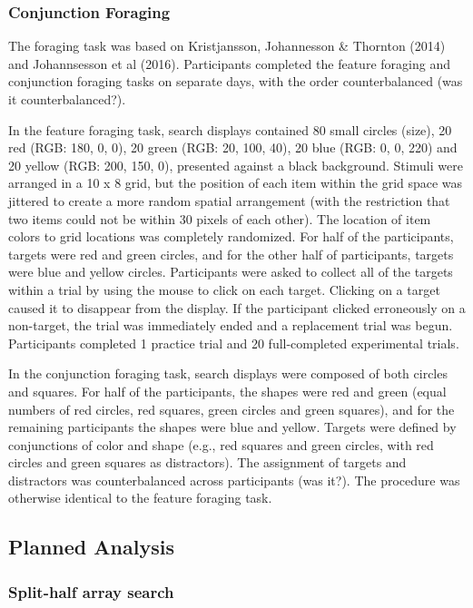 \documentclass[]{rsos}%
\begin{document}
\subsubsection{Conjunction Foraging}

The foraging task was based on Kristjansson, Johannesson & Thornton (2014) and Johannsesson et al (2016). Participants completed the feature foraging and conjunction foraging tasks on separate days, with the order counterbalanced (was it counterbalanced?).

In the feature foraging task, search displays contained 80 small circles (size), 20 red (RGB: 180, 0, 0), 20 green (RGB: 20, 100, 40), 20 blue (RGB: 0, 0, 220) and 20 yellow (RGB: 200, 150, 0), presented against a black background. Stimuli were arranged in a 10 x 8 grid, but the position of each item within the grid space was jittered to create a more random spatial arrangement (with the restriction that two items could not be within 30 pixels of each other). The location of item colors to grid locations was completely randomized. 
For half of the participants, targets were red and green circles, and for the other half of participants, targets were blue and yellow circles. Participants were asked to collect all of the targets within a trial by using the mouse to click on each target. Clicking on a target caused it to disappear from the display. If the participant clicked erroneously on a non-target, the trial was immediately ended and a replacement trial was begun. Participants completed 1 practice trial and 20 full-completed experimental trials.

In the conjunction foraging task, search displays were composed of both circles and squares. For half of the participants, the shapes were red and green (equal numbers of red circles, red squares, green circles and green squares), and for the remaining participants the shapes were blue and yellow. Targets were defined by conjunctions of color and shape (e.g., red squares and green circles, with red circles and green squares as distractors). The assignment of targets and distractors was counterbalanced across participants (was it?). The procedure was otherwise identical to the feature foraging task. 

\subsection{Planned Analysis}

\subsubsection{Split-half array search}
\end{document}
